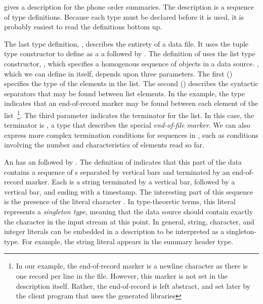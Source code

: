  gives a \padsml{} description for the
\dibbler{} phone order summaries. The description is a
sequence of type definitions. Because each type must be declared
before it is used, it is probably easiest to read the definitions
bottom up. 

The last type definition, , describes the entirety
of a \dibbler{} data file.  It uses the tuple type
constructor \cd{*} to define  as a a 
followed by . 
The definition of  uses the list type
constructor, , which specifies a homogenous sequence of
objects in a data source.  , which we can define in \padsml{} itself,
depends upon three parameters.  The first () specifies the
type of the elements in the list.  The second () describes
the syntactic separators that may be found between list elements.
In the example, the type  indicates that an end-of-record marker
may be found between each element of the list~\footnote{%
  In our example, the end-of-record marker is a newline 
  character as there is one record per line in the file.  However,
  this marker is not set in the description itself.  Rather, the
  end-of-record is left abstract, and set later by the client program
  that uses the generated libraries}. 
The third parameter indicates the terminator for the list.  In this
case, the terminator is , a 
type that describes the special \emph{end-of-file marker}.  
We can also express more complex termination
conditions for sequences in \padsml{}, such as conditions involving
the number and characteristics of elements read so far.

An  has an
 followed by .  The definition of
 indicates that this part of the \dibbler{} data 
contains a sequence of s separated by vertical bars and
terminated by an end-of-record marker.  Each  is a string
terminated by a vertical bar, followed by a vertical bar, and ending
with a timestamp.  The interesting part of this
sequence is the presence of the literal character .  In
type-theoretic terms, this literal represents a {\em singleton type},
meaning that the data source should contain exactly the character
 in the input stream at this point.  In general, string,
character, and 
integer literals can be embedded in a description to be interpreted as
a singleton-type. For example, the string literal  appears in
the summary header type.

